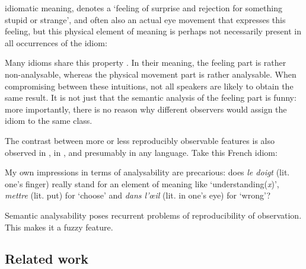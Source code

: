 \documentclass[output=paper]{langsci/langscibook}
\begin{document}
idiomatic meaning, denotes a ‘feeling of surprise and rejection for something stupid or strange’, and often also an actual eye movement that expresses this feeling, but this physical element of meaning is perhaps not necessarily present in all occurrences of the idiom:


\begin{exe}
\end{exe}

\noindent Many idioms share this property \citep[44]{Burger1998}. In their meaning, the feeling part is rather non-analysable, whereas the physical movement part is rather analysable. 
When compromising between these intuitions, not all speakers are likely to obtain the same result. It is not just that the semantic analysis of the feeling part is funny: more importantly, there is no reason why different observers would assign the idiom to the same class.

The contrast between more or less reproducibly observable features is also observed in , in , and presumably in any language. Take this French idiom:

\begin{exe}
\end{exe}

\noindent My own impressions in terms of analysability are precarious: does \textit{le doigt} (lit. one’s finger) really stand for an element of meaning like ‘understanding(\textit{x})’, \textit{mettre} (lit. put) for ‘choose’ and \textit{dans l’œil} (lit. in one’s eye) for ‘wrong’?

Semantic analysability poses recurrent problems of reproducibility of observation. This makes it a fuzzy feature.

\subsection{Related work}
\largerpage
\end{document}
